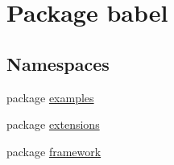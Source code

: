 \hypertarget{namespacebabel}{\section{Package babel}
\label{namespacebabel}
}
\subsection*{Namespaces}
\begin{DoxyCompactItemize}
\item 
package \hyperlink{namespacebabel_1_1examples}{examples}
\item 
package \hyperlink{namespacebabel_1_1extensions}{extensions}
\item 
package \hyperlink{namespacebabel_1_1framework}{framework}
\end{DoxyCompactItemize}
